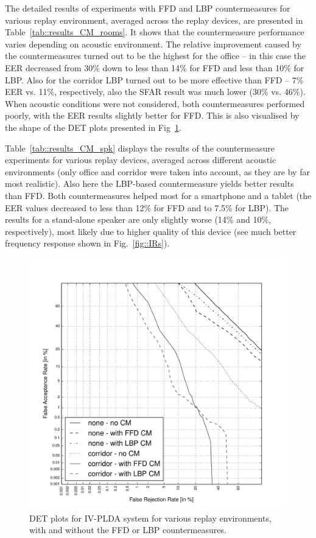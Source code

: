 The detailed results of experiments with FFD and LBP countermeasures for various replay environment, averaged across the replay devices, are presented in Table~\ref{tab::results_CM_rooms}. It shows that the countermeasure performance varies depending on acoustic environment. The relative improvement caused by the countermeasures turned out to be the highest for the office -- in this case the EER decreased from 30\% down to less than 14\% for FFD and less than 10\% for LBP. Also for the corridor LBP turned out to be more effective than FFD -- 7\% EER vs. 11\%, respectively, also the SFAR result was much lower (30\% vs. 46\%). When acoustic conditions were not considered, both countermeasures performed poorly, with the EER results slightly better for FFD. This is also visualised by the shape of the DET plots presented in Fig~\ref{fig::DETs_CM}.

Table~\ref{tab::results_CM_spk} displays the results of the countermeasure experiments for various replay devices, averaged across different acoustic environments (only office and corridor were taken into account, as they are by far most realistic). Also here the LBP-based countermeasure yields better results than FFD. Both countermeasures helped most for a smartphone and a tablet (the EER values decreased to less than 12\% for FFD and to 7.5\% for LBP). The results for a stand-alone speaker are only slightly worse (14\% and 10\%, respectively), most likely due to higher quality of this device (see much better frequency response shown in Fig.~\ref{fig::IRs}). 


\begin{figure}
	\centering
\includegraphics[width=1\linewidth]{Figs/DET_IVPLDA_counter_iPad.pdf}
	\caption{DET plots for IV-PLDA system for various replay environments, with and without the FFD or LBP countermeasures.}
	\label{fig::DETs_CM}
\end{figure}

